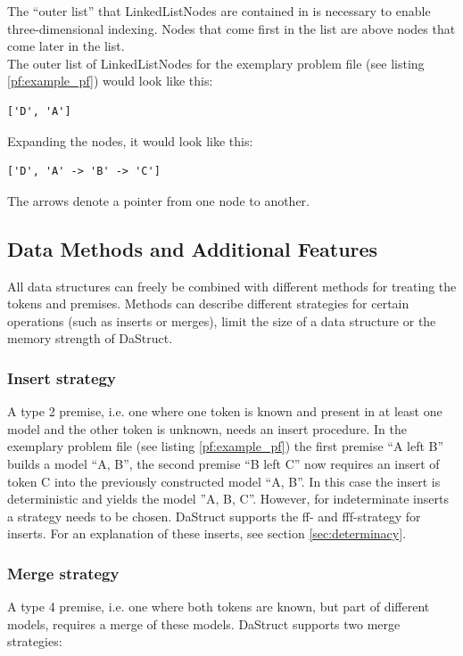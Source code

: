 \documentclass[hidelinks]{scrartcl}
\begin{document}
The ``outer list'' that LinkedListNodes are contained in is necessary to enable three-dimensional indexing. Nodes that come first in the list are above nodes that come later in the list. \\
The outer list of LinkedListNodes for the exemplary problem file (see listing \ref{pf:example_pf}) would look like this:

\begin{lstlisting}[caption=LinkedList representation, label=linkedlist_example_pf, frame=single]
['D', 'A']
\end{lstlisting}

\noindent Expanding the nodes, it would look like this:

\begin{lstlisting}[caption=Expanded LinkedList representation, label=exp_linkedlist_example_pf, frame=single]
['D', 'A' -> 'B' -> 'C']
\end{lstlisting}

The arrows denote a pointer from one node to another.

\subsection{Data Methods and Additional Features}\label{sec:data_methods}
All data structures can freely be combined with different methods for treating the tokens and premises. Methods can describe different strategies for certain operations (such as inserts or merges), limit the size of a data structure or the memory strength of DaStruct.

\subsubsection{Insert strategy}
A type 2 premise, i.e. one where one token is known and present in at least one model and the other token is unknown, needs an insert procedure. In the exemplary problem file (see listing \ref{pf:example_pf}) the first premise ``A left B'' builds a model ``A, B'', the second premise ``B left C'' now requires an insert of token C into the previously constructed model ``A, B''. In this case the insert is deterministic and yields the model ''A, B, C''. However, for indeterminate inserts a strategy needs to be chosen. DaStruct supports the ff- and fff-strategy for inserts. For an explanation of these inserts, see section \ref{sec:determinacy}.

\subsubsection{Merge strategy}\label{sec:merge_strategy}
A type 4 premise, i.e. one where both tokens are known, but part of different models, requires a merge of these models. DaStruct supports two merge strategies: \\
\end{document}
